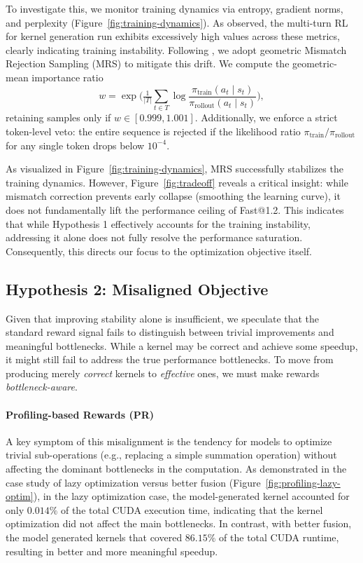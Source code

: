 To investigate this, we monitor training dynamics via entropy, gradient norms, and perplexity (Figure~\ref{fig:training-dynamics}). As observed, the multi-turn RL for kernel generation run exhibits excessively high values across these metrics, clearly indicating training instability. Following \citet{liu-li-2025-rl-collapse}, we adopt geometric Mismatch Rejection Sampling (MRS) to mitigate this drift. We compute the geometric-mean importance ratio
\begin{equation}
    w=\exp\!\Big(\tfrac{1}{|T|}\sum_{t\in T}\log\frac{\pi_{\text{train}}(a_t\mid s_t)}{\pi_{\text{rollout}}(a_t\mid s_t)}\Big),
\end{equation}
retaining samples only if $w\in[0.999,1.001]$. Additionally, we enforce a strict token-level veto: the entire sequence is rejected if the likelihood ratio $\pi_{\text{train}}/\pi_{\text{rollout}}$ for any single token drops below $10^{-4}$.

As visualized in Figure~\ref{fig:training-dynamics}, MRS successfully stabilizes the training dynamics. However, Figure~\ref{fig:tradeoff} reveals a critical insight: while mismatch correction prevents early collapse (smoothing the learning curve), it does not fundamentally lift the performance ceiling of Fast@1.2. This indicates that while Hypothesis 1 effectively accounts for the training instability, addressing it alone does not fully resolve the performance saturation. Consequently, this directs our focus to the optimization objective itself.

\subsection{Hypothesis 2: Misaligned Objective}
Given that improving stability alone is insufficient, we speculate that the standard reward signal fails to distinguish between trivial improvements and meaningful bottlenecks. While a kernel may be correct and achieve some speedup, it might still fail to address the true performance bottlenecks. To move from producing merely \emph{correct} kernels to \emph{effective} ones, we must make rewards \emph{bottleneck-aware}.

\paragraph{Profiling-based Rewards (PR)}
 A key symptom of this misalignment is the tendency for models to optimize trivial sub-operations (e.g., replacing a simple summation operation) without affecting the dominant bottlenecks in the computation. As demonstrated in the case study of lazy optimization versus better fusion (Figure~\ref{fig:profiling-lazy-optim}), in the lazy optimization case, the model-generated kernel accounted for only $0.014\%$ of the total CUDA execution time, indicating that the kernel optimization did not affect the main bottlenecks. In contrast, with better fusion, the model generated kernels that covered $86.15\%$ of the total CUDA runtime, resulting in better and more meaningful speedup.

